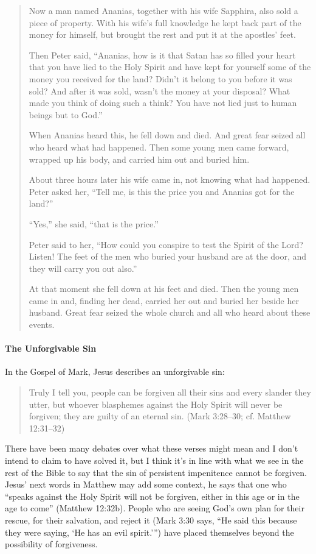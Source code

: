 \begin{quote}
    Now a man named Ananias, together with his wife Sapphira, also sold a piece
    of property. With his wife's full knowledge he kept back part of the money
    for himself, but brought the rest and put it at the apostles' feet.

    Then Peter said, \enquote{Ananias, how is it that Satan has so filled your
    heart that you have lied to the Holy Spirit and have kept for yourself some
    of the money you received for the land? Didn't it belong to you before it
    was sold? And after it was sold, wasn't the money at your disposal? What
    made you think of doing such a think? You have not lied just to human beings
    but to God.}

    When Ananias heard this, he fell down and died. And great fear seized all
    who heard what had happened. Then some young men came forward, wrapped up
    his body, and carried him out and buried him.

    About three hours later his wife came in, not knowing what had happened.
    Peter asked her, \enquote{Tell me, is this the price you and Ananias got for
    the land?}

    \enquote{Yes,} she said, \enquote{that is the price.}

    Peter said to her, \enquote{How could you conspire to test the Spirit of the
    Lord? Listen! The feet of the men who buried your husband are at the door,
    and they will carry you out also.}

    At that moment she fell down at his feet and died. Then the young men came
    in and, finding her dead, carried her out and buried her beside her husband.
    Great fear seized the whole church and all who heard about these events.
\end{quote}

\paragraph{The Unforgivable Sin} In the Gospel of Mark, Jesus describes an
unforgivable sin:

\begin{quote}
    Truly I tell you, people can be forgiven all their sins and every slander
    they utter, but whoever blasphemes against the Holy Spirit will never be
    forgiven; they are guilty of an eternal sin. (Mark 3:28--30; cf. Matthew
    12:31--32)
\end{quote}

There have been many debates over what these verses might mean and I don't
intend to claim to have solved it, but I think it's in line with what we see in
the rest of the Bible to say that the sin of persistent impenitence cannot be
forgiven. Jesus' next words in Matthew may add some context, he says that one
who \enquote{speaks against the Holy Spirit will not be forgiven, either in this
age or in the age to come} (Matthew 12:32b). People who are seeing God's own
plan for their rescue, for their salvation, and reject it (Mark 3:30 says,
\enquote{He said this because they were saying, \enquote{He has an evil
spirit.}}) have placed themselves beyond the possibility of forgiveness.

